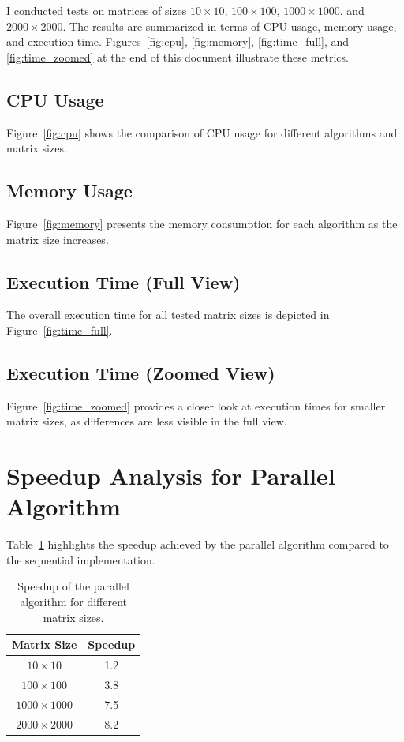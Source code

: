 \documentclass[a4paper,12pt]{article}
\begin{document}
I conducted tests on matrices of sizes $10 \times 10$, $100 \times 100$, $1000 \times 1000$, and $2000 \times 2000$. The results are summarized in terms of CPU usage, memory usage, and execution time. Figures~\ref{fig:cpu}, \ref{fig:memory}, \ref{fig:time_full}, and \ref{fig:time_zoomed} at the end of this document illustrate these metrics.

\subsection{CPU Usage}
Figure~\ref{fig:cpu} shows the comparison of CPU usage for different algorithms and matrix sizes.

\subsection{Memory Usage}
Figure~\ref{fig:memory} presents the memory consumption for each algorithm as the matrix size increases.

\subsection{Execution Time (Full View)}
The overall execution time for all tested matrix sizes is depicted in Figure~\ref{fig:time_full}.

\subsection{Execution Time (Zoomed View)}
Figure~\ref{fig:time_zoomed} provides a closer look at execution times for smaller matrix sizes, as differences are less visible in the full view.

\section{Speedup Analysis for Parallel Algorithm}

Table~\ref{tab:speedup} highlights the speedup achieved by the parallel algorithm compared to the sequential implementation.

\begin{table}[h!]
    \centering
    \begin{tabular}{cc}
        \toprule
        \textbf{Matrix Size} & \textbf{Speedup} \\
        \midrule
        $10 \times 10$ & 1.2 \\
        $100 \times 100$ & 3.8 \\
        $1000 \times 1000$ & 7.5 \\
        $2000 \times 2000$ & 8.2 \\
        \bottomrule
    \end{tabular}
    \caption{Speedup of the parallel algorithm for different matrix sizes.}
    \label{tab:speedup}
\end{table}
\end{document}
